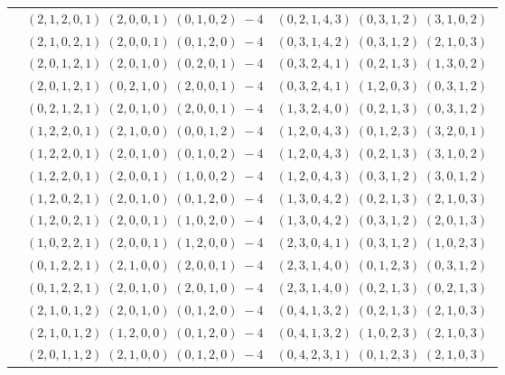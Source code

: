 \documentclass[11pt]{article}
\begin{document}
\begin{longtable}[l]{|c|c|c|}
 \cline{2-3} 
 & $(2 ,1 ,2 ,0 ,1) \;(2 ,0 ,0 ,1) \;(0 ,1 ,0 ,2) \;-4$ & $(0 ,2 ,1 ,4 ,3) \;(0 ,3 ,1 ,2) \;(3 ,1 ,0 ,2) \;$\\ 
 \cline{2-3} 
 & $(2 ,1 ,0 ,2 ,1) \;(2 ,0 ,0 ,1) \;(0 ,1 ,2 ,0) \;-4$ & $(0 ,3 ,1 ,4 ,2) \;(0 ,3 ,1 ,2) \;(2 ,1 ,0 ,3) \;$\\ 
 \cline{2-3} 
 & $(2 ,0 ,1 ,2 ,1) \;(2 ,0 ,1 ,0) \;(0 ,2 ,0 ,1) \;-4$ & $(0 ,3 ,2 ,4 ,1) \;(0 ,2 ,1 ,3) \;(1 ,3 ,0 ,2) \;$\\ 
 \cline{2-3} 
 & $(2 ,0 ,1 ,2 ,1) \;(0 ,2 ,1 ,0) \;(2 ,0 ,0 ,1) \;-4$ & $(0 ,3 ,2 ,4 ,1) \;(1 ,2 ,0 ,3) \;(0 ,3 ,1 ,2) \;$\\ 
 \cline{2-3} 
 & $(0 ,2 ,1 ,2 ,1) \;(2 ,0 ,1 ,0) \;(2 ,0 ,0 ,1) \;-4$ & $(1 ,3 ,2 ,4 ,0) \;(0 ,2 ,1 ,3) \;(0 ,3 ,1 ,2) \;$\\ 
 \cline{2-3} 
 & $(1 ,2 ,2 ,0 ,1) \;(2 ,1 ,0 ,0) \;(0 ,0 ,1 ,2) \;-4$ & $(1 ,2 ,0 ,4 ,3) \;(0 ,1 ,2 ,3) \;(3 ,2 ,0 ,1) \;$\\ 
 \cline{2-3} 
 & $(1 ,2 ,2 ,0 ,1) \;(2 ,0 ,1 ,0) \;(0 ,1 ,0 ,2) \;-4$ & $(1 ,2 ,0 ,4 ,3) \;(0 ,2 ,1 ,3) \;(3 ,1 ,0 ,2) \;$\\ 
 \cline{2-3} 
 & $(1 ,2 ,2 ,0 ,1) \;(2 ,0 ,0 ,1) \;(1 ,0 ,0 ,2) \;-4$ & $(1 ,2 ,0 ,4 ,3) \;(0 ,3 ,1 ,2) \;(3 ,0 ,1 ,2) \;$\\ 
 \cline{2-3} 
 & $(1 ,2 ,0 ,2 ,1) \;(2 ,0 ,1 ,0) \;(0 ,1 ,2 ,0) \;-4$ & $(1 ,3 ,0 ,4 ,2) \;(0 ,2 ,1 ,3) \;(2 ,1 ,0 ,3) \;$\\ 
 \cline{2-3} 
 & $(1 ,2 ,0 ,2 ,1) \;(2 ,0 ,0 ,1) \;(1 ,0 ,2 ,0) \;-4$ & $(1 ,3 ,0 ,4 ,2) \;(0 ,3 ,1 ,2) \;(2 ,0 ,1 ,3) \;$\\ 
 \cline{2-3} 
 & $(1 ,0 ,2 ,2 ,1) \;(2 ,0 ,0 ,1) \;(1 ,2 ,0 ,0) \;-4$ & $(2 ,3 ,0 ,4 ,1) \;(0 ,3 ,1 ,2) \;(1 ,0 ,2 ,3) \;$\\ 
 \cline{2-3} 
 & $(0 ,1 ,2 ,2 ,1) \;(2 ,1 ,0 ,0) \;(2 ,0 ,0 ,1) \;-4$ & $(2 ,3 ,1 ,4 ,0) \;(0 ,1 ,2 ,3) \;(0 ,3 ,1 ,2) \;$\\ 
 \cline{2-3} 
 & $(0 ,1 ,2 ,2 ,1) \;(2 ,0 ,1 ,0) \;(2 ,0 ,1 ,0) \;-4$ & $(2 ,3 ,1 ,4 ,0) \;(0 ,2 ,1 ,3) \;(0 ,2 ,1 ,3) \;$\\ 
 \cline{2-3} 
 & $(2 ,1 ,0 ,1 ,2) \;(2 ,0 ,1 ,0) \;(0 ,1 ,2 ,0) \;-4$ & $(0 ,4 ,1 ,3 ,2) \;(0 ,2 ,1 ,3) \;(2 ,1 ,0 ,3) \;$\\ 
 \cline{2-3} 
 & $(2 ,1 ,0 ,1 ,2) \;(1 ,2 ,0 ,0) \;(0 ,1 ,2 ,0) \;-4$ & $(0 ,4 ,1 ,3 ,2) \;(1 ,0 ,2 ,3) \;(2 ,1 ,0 ,3) \;$\\ 
 \cline{2-3} 
 & $(2 ,0 ,1 ,1 ,2) \;(2 ,1 ,0 ,0) \;(0 ,1 ,2 ,0) \;-4$ & $(0 ,4 ,2 ,3 ,1) \;(0 ,1 ,2 ,3) \;(2 ,1 ,0 ,3) \;$\\ 

\end{longtable}
\end{document}
